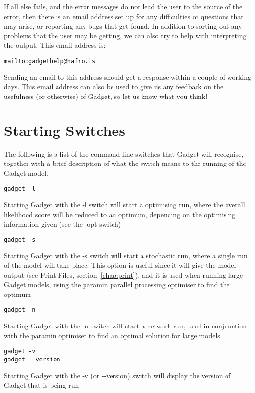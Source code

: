 \documentclass [a4paper, 10pt]{book}
\begin{document}
\bigskip
If all else fails, and the error messages do not lead the user to the source of the error, then there is an email address set up for any difficulties or questions that may arise, or reporting any bugs that get found.  In addition to sorting out any problems that the user may be getting, we can also try to help with interpreting the output.  This email address is:

{\small\begin{verbatim}
mailto:gadgethelp@hafro.is
\end{verbatim}}

Sending an email to this address should get a response within a couple of working days.  This email address can also be used to give us any feedback on the usefulness (or otherwise) of Gadget, so let us know what you think!

\section{Starting Switches}\label{sec:starting}
The following is a list of the command line switches that Gadget will recognise, together with a brief description of what the switch means to the running of the Gadget model.

{\small\begin{verbatim}
gadget -l
\end{verbatim}}
Starting Gadget with the -l switch will start a optimising run, where the overall likelihood score will be reduced to an optimum, depending on the optimising information given (see the -opt switch)

{\small\begin{verbatim}
gadget -s
\end{verbatim}}
Starting Gadget with the -s switch will start a stochastic run, where a single run of the model will take place.  This option is useful since it will give the model output (see Print Files, section~\ref{chap:print}), and it is used when running large Gadget models, using the paramin parallel processing optimiser to find the optimum

{\small\begin{verbatim}
gadget -n
\end{verbatim}}
Starting Gadget with the -n switch will start a network run, used in conjunction with the paramin optimiser to find an optimal solution for large models

{\small\begin{verbatim}
gadget -v
gadget --version
\end{verbatim}}
Starting Gadget with the -v (or -\hspace{0pt}-version) switch will display the version of Gadget that is being run
\end{document}
